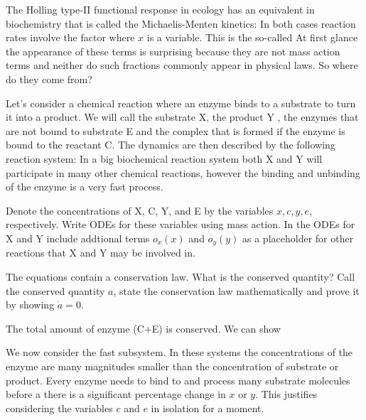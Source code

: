 The Holling type-II functional response in ecology has an equivalent in biochemistry that is called the  Michaelis-Menten kinetics:
In both cases reaction rates involve the factor
where $x$ is a variable. This is the so-called
At first glance the appearance of these terms is surprising because they are not mass action terms and neither do such fractions commonly appear in physical laws. So where do they come from?

Let's consider a chemical reaction where an enzyme binds to a substrate to turn it into a product. We will call the substrate X, the product Y , the enzymes that are not bound to substrate E and the complex that is formed if the enzyme is bound to the reactant C. The dynamics are then described by the following reaction system:
In a big biochemical reaction system both X and Y will participate in many other chemical reactions, however the binding and unbinding of the enzyme is a very fast process. 

\subquestion
Denote the concentrations of X, C, Y, and E by the variables $x,c,y,e$, respectively. Write ODEs for these variables using mass action. In the ODEs for X and Y include addtional terms $o_x(x)$ and $o_y(y)$ as a placeholder for other reactions that X and Y may be involved in.

\solution
{}

\subquestion
The equations contain a conservation law. What is the conserved quantity? Call the conserved quantity $a$, state the conservation law mathematically and prove it by showing $\dot{a}=0$.

\solution
The total amount of enzyme (C+E) is conserved.
We can show

\subquestion
We now consider the fast subsystem. In these systems the concentrations of the enzyme are many magnitudes smaller than the concentration of substrate or product. Every enzyme needs to bind to and process many substrate molecules before a there is a significant percentage change in $x$ or $y$. This justifies considering the variables $c$ and $e$ in isolation for a moment. 

